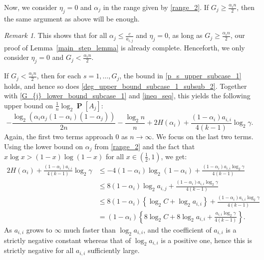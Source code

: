 \documentclass[11pt,reqno]{amsart}
\theoremstyle{definition}
\theoremstyle{remark}
\newtheorem{rem}[theorem]{Remark}
\theoremstyle{conjecture}
\DeclareMathOperator{\Prob}{\mathbf{P}}
\begin{document}
Now, we consider $\eta_{j} = 0$ and $\alpha_{j}$ in the range given by \eqref{range_2}. If $G_{j} \geqslant \frac{\alpha_{i}n}{2}$, then the same argument as above will be enough. 
\begin{rem}\label{no_need_3}
This shows that for all $\alpha_{j} \leqslant \frac{c}{a_{i,j}}$ and $\eta_{j} = 0$, as long as $G_{j} \geqslant \frac{\alpha_{i}n}{2}$, our proof of Lemma~\ref{main_step_lemma} is already complete. Henceforth, we only consider $\eta_{j} = 0$ and $G_{j} < \frac{\alpha_{i} n}{2}$.
\end{rem}

If $G_{j} < \frac{\alpha_{i} n}{2}$, then for each $s = 1, \ldots, G_{j}$, the bound in \eqref{p_s_upper_subcase_1} holds, and hence so does \eqref{deg_upper_bound_subcase_1_subsub_2}. Together with \eqref{G_{j}_lower_bound_subcase_1} and \eqref{ineq_seq}, this yields the following upper bound on $\frac{1}{n} \log_{2}\Prob[A_{j}]$:
\begin{equation}
-\frac{\log_{2}(\alpha_{i} \alpha_{j} (1-\alpha_{i}) (1-\alpha_{j}))}{2n} - \frac{\log_{2} n}{n} + 2 H(\alpha_{i}) + \frac{(1-\alpha_{i}) a_{i,i}}{4(k-1)} \log_{2} \gamma. \nonumber
\end{equation}
Again, the first two terms approach $0$ as $n \rightarrow \infty$. We focus on the last two terms. Using the lower bound on $\alpha_{j}$ from \eqref{range_2} and the fact that $x \log x > (1-x) \log (1-x)$ for all $x \in \left(\frac{1}{2}, 1\right)$, we get:
\begin{align}
2 H(\alpha_{i}) + \frac{(1-\alpha_{i}) a_{i,i}}{4(k-1)} \log_{2} \gamma &\leqslant -4 (1-\alpha_{i}) \log_{2} (1-\alpha_{i}) + \frac{(1-\alpha_{i}) a_{i,i} \log_{2} \gamma}{4(k-1)} \nonumber\\
&\leqslant 8 (1-\alpha_{i}) \log_{2} a_{i,j} + \frac{(1-\alpha_{i}) a_{i,i} \log_{2} \gamma}{4(k-1)} \nonumber\\
&\leqslant 8 (1-\alpha_{i}) \left\{\log_{2} C + \log_{2} a_{i,i}\right\} + \frac{(1-\alpha_{i}) a_{i,i} \log_{2} \gamma}{4(k-1)} \nonumber\\
&= (1-\alpha_{i}) \left\{8 \log_{2} C + 8 \log_{2} a_{i,i} + \frac{a_{i,i} \log_{2} \gamma}{4(k-1)}\right\}. \nonumber
\end{align} 
As $a_{i,i}$ grows to $\infty$ much faster than $\log_{2} a_{i,i}$, and the coefficient of $a_{i,i}$ is a strictly negative constant whereas that of $\log_{2} a_{i,i}$ is a positive one, hence this is strictly negative for all $a_{i,i}$ sufficiently large.
\end{document}
